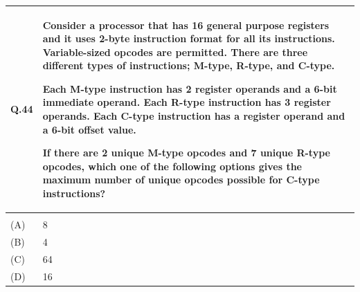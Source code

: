 \documentclass[14pt]{article}
\renewcommand{\arraystretch}{1.25}
\begin{document}
\begin{tabular}{|p{1.5cm}|p{12cm}|}
\hline

Q.44 &
\parbox[t]{\linewidth}{

Consider a processor that has 16 general purpose registers and it uses 
2-byte instruction format for all its instructions. Variable-sized opcodes 
are permitted. There are three different types of instructions; M-type, 
R-type, and C-type.

Each M-type instruction has 2 register operands and a 6-bit immediate 
operand. Each R-type instruction has 3 register operands. Each C-type 
instruction has a register operand and a 6-bit offset value.

If there are 2 unique M-type opcodes and 7 unique R-type opcodes, which 
one of the following options gives the maximum number of unique opcodes 
possible for C-type instructions?

\vspace{0.35cm}
}
\\
\hline

& \\[-0.15cm]
\hline

(A) & 8 \\[0.25cm]
\hline

(B) & 4 \\[0.25cm]
\hline

(C) & 64 \\[0.25cm]
\hline

(D) & 16 \\[0.25cm]
\hline

\end{tabular}

\vspace{0.3cm}

\renewcommand{\arraystretch}{1.25}
\end{document}
